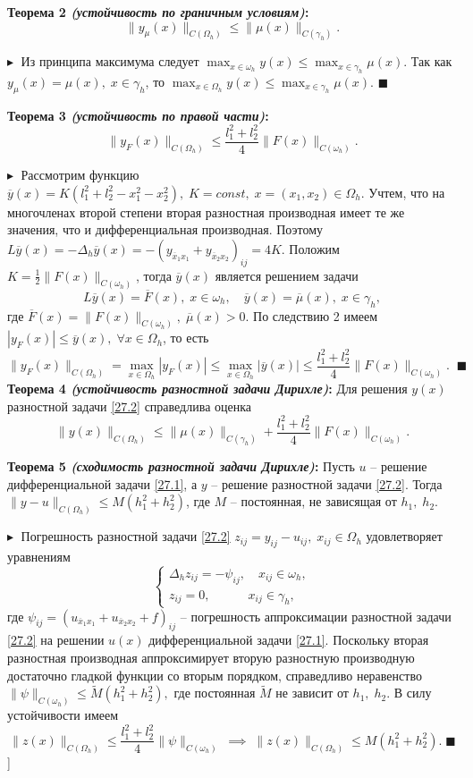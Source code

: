 \textbf{Теорема 2 \textit{(устойчивость по граничным условиям)}:} 
$$\|y_\mu (x)\|_{C(\Omega_h)} \leq \|\mu(x)\|_{C(\gamma_h)}.$$

$\blacktriangleright\;$ Из принципа максимума следует $ \max_{x\in\omega_h} y(x) \leq \max_{x\in\gamma_h} \mu(x)$. Так как $y_\mu(x) = \mu(x),\;x\in\gamma_h$, то $ \max_{x\in\Omega_h} y(x) \leq \max_{x\in\gamma_h} \mu(x)$.\; $\blacksquare$

\textbf{Теорема 3 \textit{(устойчивость по правой части)}:}
$$\|y_F(x)\|_{C(\Omega_h)} \leq \frac{l_1^2 + l_2^2}{4} \|F(x)\|_{C(\omega_h)}.$$

$\blacktriangleright\;$ Рассмотрим функцию $\overline{y}(x) = K(l_1^2 + l_2^2 - x_1^2 - x_2^2),\; K= const, \; x = (x_1, x_2) \in \Omega_h$. Учтем, что на многочленах второй степени вторая разностная производная имеет те же значения, что и дифференциальная производная.
Поэтому $L \overline{y}(x) = - \Delta_h \overline{y}(x) = -(y_{\overline{x}_1x_1} + y_{\overline{x}_2x_2})_{ij} = 4K$. Положим $K = \frac{1}{2}\|F(x)\|_{C(\omega_h)}$, тогда $\overline{y}(x)$ является решением задачи 
$$
L\overline{y}(x) = \overline{F}(x), \; x\in \omega_h, \quad \overline{y}(x) = \overline{\mu}(x),\; x\in \gamma_h,
$$
где $\overline{F}(x) = \|F(x)\|_{C(\omega_h)}, \; \overline{\mu}(x) > 0$. По следствию 2 имеем $|y_F(x)| \leq \overline{y}(x), \;\forall x \in \Omega_h$, то есть 
$$
\|y_F(x)\|_{C(\Omega_h)} = \max_{x\in\Omega_h} |y_F(x)| \leq \max_{x\in\Omega_h} |\overline{y}(x)| \leq   \frac{l_1^2 + l_2^2}{4} \|F(x)\|_{C(\omega_h)}. \;\;\blacksquare
$$
\textbf{Теорема 4 \textit{(устойчивость разностной задачи Дирихле)}:} \; Для решения $y(x)$ разностной задачи \eqref{27.2} справедлива оценка
$$
\|y(x)\|_{C(\Omega_h)} \leq \|\mu(x)\|_{C(\gamma_h)} + \frac{l_1^2 + l_2^2}{4} \|F(x)\|_{C(\omega_h)}.
$$

\textbf{Теорема 5 \textit{(сходимость разностной задачи Дирихле)}:}\; Пусть $u$ -- решение дифференциальной задачи \eqref{27.1}, а $y$ -- решение разностной задачи \eqref{27.2}. Тогда $\|y - u\|_{C(\Omega_h)} \leq M(h_1^2 + h_2^2)$, где $M$ -- постоянная, не зависящая от $h_1, \; h_2$.

$\blacktriangleright\;$ Погрешность разностной задачи \eqref{27.2} $z_{ij} = y_{ij} - u_{ij}, \; x_{ij} \in \Omega_h$ удовлетворяет уравнениям 
$$
\begin{cases}
    \Delta_h z_{ij} = - \psi_{ij}, \quad x_{ij} \in \omega_h,\\
    z_{ij} = 0, \qquad\quad x_{ij} \in \gamma_h,
\end{cases}
$$
где $\psi_{ij} = (u_{\overline{x}_1x_1} + u_{\overline{x}_2x_2} + f)_{ij}$ -- погрешность аппроксимации разностной задачи \eqref{27.2} на решении $u(x)$ дифференциальной задачи \eqref{27.1}. Поскольку вторая разностная производная аппроксимирует вторую разностную производную достаточно гладкой функции со вторым порядком, справедливо неравенство 
$
\|\psi\|_{C(\omega_h)} \leq \widetilde{M}(h_1^2 + h_2^2),
$ 
где постоянная $\widetilde{M}$ не зависит от $h_1, \;h_2$. В силу устойчивости имеем 
$$
\|z(x)\|_{C(\Omega_h)} \leq \frac{l_1^2 + l_2^2}{4} \|\psi\|_{C(\omega_h)} \;\implies \; 
\|z(x)\|_{C(\Omega_h)} \leq M(h_1^2 + h_2^2). \; \blacksquare
$$
\bigbreak
[\cite[pages 32-41]{abakumov}]